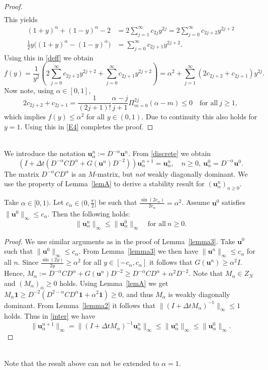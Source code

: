 \documentclass{siamltex}
\newcommand{\bu}{\mathbf u}
\newcommand{\bfone}{\mathbf{1}}
\begin{document}
{\begin{proof}
\begin{align*}
\end{align*}
This yields
\[ \begin{split}
 (1+y)^\alpha +(1-y)^\alpha -2  & = 2 \sum_{j=1}^\infty c_{2j} y^{2j} = 2 \sum_{j=0}^\infty c_{2j+2} y^{2j+2} \\
 \tfrac12 y \big((1+y)^\alpha -(1-y)^\alpha\big) &= \sum_{j=0}^\infty c_{2j+1} y^{2j+2}.
\end{split}
\]
Using this in \eqref{deff} we obtain
\[
  f(y)= \frac{1}{y^2}\left( 2 \sum_{j=0}^\infty c_{2j+2} y^{2j+2} +  \sum_{j=0}^\infty c_{2j+1} y^{2j+2} \right) =
   \alpha^2 + \sum_{j=1}^\infty (2 c_{2j+2} + c_{2j+1}) y^{2j}. 
\]
Now note, using $\alpha \in [0,1]$, 
\[
  2 c_{2j+2} + c_{2j+1}= \frac{1}{(2j+1)!}  \frac{\alpha-j}{j+1}\Pi_{m=0}^{2j} (\alpha -m)   \leq 0 \quad \text{for all}~j \geq 1,
\]
which implies $f(y) \leq \alpha^2$ for all $y \in (0,1)$. Due to continuity this also holds for $y=1$. Using this in \eqref{E4} completes the proof. 
 \end{proof}
\ \\[1ex]
We introduce the notation $\bu_\alpha^n:=D^{-\alpha} \bu^n$.
From \eqref{discrete} we obtain
\begin{equation} \label{inter}
 (I+\Delta t (D^{-\alpha}CD^\alpha+ G(\bu^n)D^{-2}))\bu_\alpha^{n+1}=  \bu_\alpha^n, \quad n \geq 0, ~\bu_\alpha^0=D^{-\alpha}\bu^0.
\end{equation}
The matrix $D^{-\alpha}CD^\alpha$ is an $M$-matrix, but \emph{not} weakly diagonally dominant. We use the property of Lemma~\ref{lemA} to derive a stability result for  $(\bu_\alpha^n)_{n \geq 0}$.
\begin{lemma} \label{lemma4}
 Take $\alpha \in [0,1)$. Let $c_\alpha \in (0,\tfrac{\pi}{2}]$ be such that $\frac{\sin(2c_\alpha)}{2c_\alpha}=\alpha^2$.  Assume $\bu^0$ satisfies $\|\bu^0\|_\infty \leq c_\alpha$. Then the following holds:
 \[
   \|\bu_\alpha^n\|_\infty \leq \|\bu_\alpha^0\|_\infty \quad \text{for all}~n \geq 0.
 \]
\end{lemma}
\begin{proof}
 We use similar arguments as in the proof of Lemma~\ref{lemma3}. Take $\bu^0$ such that $\|\bu^0\|_\infty \leq c_\alpha$. From Lemma~\ref{lemma3} we then have $\|\bu^n\|_\infty \leq c_\alpha$ for all $n$. Since $\frac{\sin (2y)}{2y} \geq \alpha^2$ for all $y \in [-c_\alpha,c_\alpha]$ it follows that
 $G(\bu^n) \geq \alpha^2 I$. Hence, $M_\alpha:=D^{-\alpha}CD^\alpha+ G(\bu^n)D^{-2} \geq D^{-\alpha}CD^\alpha +\alpha^2 D^{-2}$. Note that $M_\alpha \in Z_N$ and $(M_\alpha)_{ii} \geq  0$ holds. Using Lemma~\ref{lemA} we get $M_\alpha \bfone \geq D^{-2}( D^{2-\alpha}C D^\alpha \bfone + \alpha^2 \bfone) \geq 0$, and thus $M_\alpha$ is weakly diagonally dominant.   From Lemma~\ref{lemma2} it follows that $\|(I+ \Delta t M_\alpha)^{-1}\|_\infty \leq 1$ holds. Thus in \eqref{inter} we have
\[
 \|\bu_\alpha^{n+1}\|_{\infty} = \|(I+ \Delta t M_\alpha)^{-1}\bu_\alpha^n\|_\infty \leq \| \bu_\alpha^n\|_\infty \leq  \|\bu_\alpha^0\|_\infty.
\]
\end{proof}
\ \\[1ex]
Note that the result above can not be extended to $\alpha=1$. 

}
\end{document}
